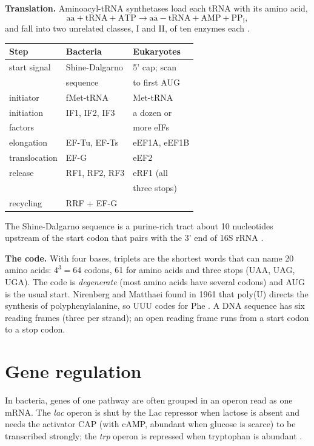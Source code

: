 \textbf{Translation.}
Aminoacyl-tRNA synthetases load each tRNA
with its amino acid,
$$
\mathrm{aa} + \mathrm{tRNA} + \mathrm{ATP}
\rightarrow \mathrm{aa{-}tRNA} + \mathrm{AMP}
+ \mathrm{PP_i},
$$
and fall into two unrelated classes, I and
II, of ten enzymes each \cite[Chapter
27]{voet2013fundamentals}.

\begin{center}
\begin{tabular}{lll}
Step & Bacteria & Eukaryotes \\
\hline
start signal & Shine-Dalgarno & 5' cap; scan
\\
 & sequence & to first AUG \\
initiator & fMet-tRNA & Met-tRNA \\
initiation & IF1, IF2, IF3 & a dozen or \\
factors & & more eIFs \\
elongation & EF-Tu, EF-Ts & eEF1A, eEF1B \\
translocation & EF-G & eEF2 \\
release & RF1, RF2, RF3 & eRF1 (all \\
 & & three stops) \\
recycling & RRF + EF-G & \\
\end{tabular}
\end{center}

The Shine-Dalgarno sequence is a purine-rich
tract about 10 nucleotides upstream of the
start codon that pairs with the 3' end of 16S
rRNA \cite[Chapter 27]{voet2013fundamentals}.

\textbf{The code.}
With four bases, triplets are the shortest
words that can name 20 amino acids: $4^3 =
64$ codons, 61 for amino acids and three
stops (UAA, UAG, UGA). The code is
\emph{degenerate} (most amino acids have
several codons) and AUG is the usual start.
Nirenberg and Matthaei found in 1961 that
poly(U) directs the synthesis of
polyphenylalanine, so UUU codes for Phe
\cite[Section 27-1]{voet2013fundamentals}. A
DNA sequence has six reading frames (three
per strand); an open reading frame runs from
a start codon to a stop codon.

\section{Gene regulation}
\label{section-mcb-regulation}

In bacteria, genes of one pathway are often
grouped in an operon read as one mRNA. The
\emph{lac} operon is shut by the Lac
repressor when lactose is absent and needs
the activator CAP (with cAMP, abundant when
glucose is scarce) to be transcribed
strongly; the \emph{trp} operon is repressed
when tryptophan is abundant \cite[Chapter
8]{alberts2014essential}.

